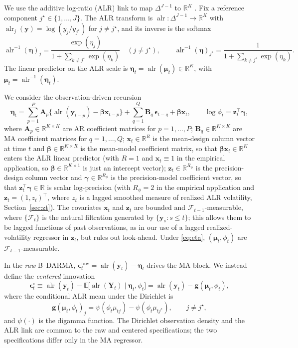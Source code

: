 \documentclass[12pt]{article}
\newcommand{\calF}{\mathcal{F}}
\theoremstyle{remark}
\newcommand{\R}{\mathbb{R}}
\newcommand{\E}{\mathbb{E}}
\newcommand{\alr}{\operatorname{alr}}
\newcommand{\bfmu}{\boldsymbol{\mu}}
\newcommand{\bfeta}{\boldsymbol{\eta}}
\newcommand{\bfbeta}{\boldsymbol{\beta}}
\newcommand{\bfgamma}{\boldsymbol{\gamma}}
\newcommand{\bfA}{\mathbf{A}}
\newcommand{\bfB}{\mathbf{B}}
\newcommand{\bfx}{\mathbf{x}}
\newcommand{\bfz}{\mathbf{z}}
\newcommand{\bfY}{\mathbf{Y}}
\newcommand{\bfy}{\mathbf{y}}
\begin{document}
We use the additive log-ratio (ALR) link to map $\Delta^{J-1}$ to $\R^K$ \citep{aitchison1982statistical}. Fix a reference component $j^\star\in\{1,\ldots,J\}$. The ALR transform is $\alr:\Delta^{J-1}\to\R^K$ with $\alr_j(\bfy)=\log(y_j/y_{j^\star})$ for $j\neq j^\star$, and its inverse is the softmax
\[
\alr^{-1}(\bfeta)_j=\frac{\exp(\eta_j)}{1+\sum_{k\neq j^\star}\exp(\eta_k)}\quad(j\neq j^\star),\qquad \alr^{-1}(\bfeta)_{j^\star}=\frac{1}{1+\sum_{k\neq j^\star}\exp(\eta_k)}.
\]
The linear predictor on the ALR scale is $\bfeta_t=\alr(\bfmu_t)\in\R^K$, with $\bfmu_t=\alr^{-1}(\bfeta_t)$.

We consider the observation-driven recursion
\begin{equation}
\label{eq:eta}
\bfeta_t
= \sum_{p=1}^P \bfA_p\{\alr(\bfy_{t-p})-\bfbeta\bfx_{t-p}\}
+ \sum_{q=1}^Q \bfB_q\,\boldsymbol{\epsilon}_{t-q}
+ \bfbeta\bfx_t,
\qquad
\log\phi_t=\bfz_t^\top\bfgamma,
\end{equation}
where $\bfA_p\in\R^{K\times K}$ are AR coefficient matrices for $p=1,\ldots,P$; $\bfB_q\in\R^{K\times K}$ are MA coefficient matrices for $q=1,\ldots,Q$; $\bfx_t\in\R^{R}$ is the mean-design column vector at time $t$ and $\bfbeta\in\R^{K\times R}$ is the mean-model coefficient matrix, so that $\bfbeta\bfx_t\in\R^K$ enters the ALR linear predictor (with $R=1$ and $\bfx_t\equiv 1$ in the empirical application, so $\bfbeta\in\R^{K\times 1}$ is just an intercept vector); $\bfz_t\in\R^{R_\phi}$ is the precision-design column vector and $\bfgamma\in\R^{R_\phi}$ is the precision-model coefficient vector, so that $\bfz_t^\top\bfgamma\in\R$ is scalar log-precision (with $R_\phi=2$ in the empirical application and $\bfz_t=(1,z_t)^\top$, where $z_t$ is a lagged smoothed measure of realized ALR volatility, Section~\ref{sec:zt}). The covariates $\bfx_t$ and $\bfz_t$ are bounded and $\calF_{t-1}$-measurable, where $\{\calF_t\}$ is the natural filtration generated by $\{\bfy_s:s\le t\}$; this allows them to be lagged functions of past observations, as in our use of a lagged realized-volatility regressor in $\bfz_t$, but rules out look-ahead. Under \eqref{eq:eta}, $(\bfmu_t,\phi_t)$ are $\calF_{t-1}$-measurable.

In the \emph{raw} B--DARMA, $\boldsymbol{\epsilon}_t^{\text{raw}}=\alr(\bfy_t)-\bfeta_t$ drives the MA block. We instead define the \emph{centered} innovation
\begin{equation}
\label{eq:centered}
\boldsymbol{\epsilon}_t^\circ \equiv \alr(\bfy_t) - \E\!\big[\alr(\bfY_t)\mid \bfeta_t,\phi_t\big]
= \alr(\bfy_t) - \mathbf{g}(\bfmu_t,\phi_t),
\end{equation}
where the conditional ALR mean under the Dirichlet is
\begin{equation}
\label{eq:g}
\mathbf{g}(\bfmu_t,\phi_t)_j=\psi(\phi_t\mu_{tj})-\psi(\phi_t\mu_{t j^\star}), \qquad j\neq j^\star,
\end{equation}
and $\psi(\cdot)$ is the digamma function. The Dirichlet observation density and the ALR link are common to the raw and centered specifications; the two specifications differ only in the MA regressor.
\end{document}
